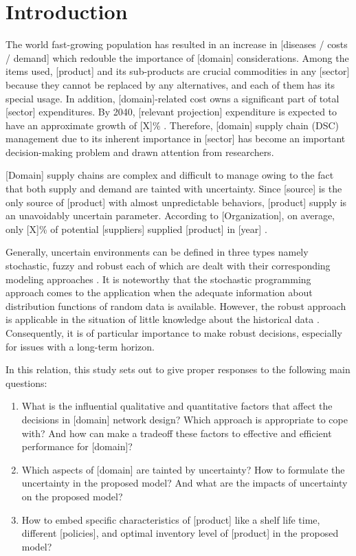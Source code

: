 \documentclass[10pt,twocolumn]{article}
\begin{document}
\thispagestyle{firstpage}

\section{Introduction}

The world fast-growing population has resulted in an increase in
[diseases / costs / demand] which redouble the importance of
[domain] considerations. Among the items used, [product] and its
sub-products are crucial commodities in any [sector] because they
cannot be replaced by any alternatives, and each of them has its
special usage. In addition, [domain]-related cost owns a significant
part of total [sector] expenditures. By 2040, [relevant projection]
expenditure is expected to have an approximate growth of [X]\%
\cite{Author2015}. Therefore, [domain] supply chain (DSC)
management due to its inherent importance in [sector] has become an
important decision-making problem and drawn attention from
researchers.

[Domain] supply chains are complex and difficult to manage owing to
the fact that both supply and demand are tainted with uncertainty.
Since [source] is the only source of [product] with almost
unpredictable behaviors, [product] supply is an unavoidably uncertain
parameter. According to [Organization], on average, only [X]\% of
potential [suppliers] supplied [product] in [year] \cite{WHO2016}.

Generally, uncertain environments can be defined in three types
namely stochastic, fuzzy and robust each of which are dealt with
their corresponding modeling approaches \cite{Tofighi2016}. It is
noteworthy that the stochastic programming approach comes to the
application when the adequate information about distribution
functions of random data is available. However, the robust approach
is applicable in the situation of little knowledge about the historical
data \cite{Torabi2015}. Consequently, it is of particular importance
to make robust decisions, especially for issues with a long-term
horizon.

In this relation, this study sets out to give proper responses to the
following main questions:

\begin{enumerate}
  \item What is the influential qualitative and quantitative factors
        that affect the decisions in [domain] network design? Which
        approach is appropriate to cope with? And how can make a
        tradeoff these factors to effective and efficient performance
        for [domain]?
  \item Which aspects of [domain] are tainted by uncertainty? How to
        formulate the uncertainty in the proposed model? And what are
        the impacts of uncertainty on the proposed model?
  \item How to embed specific characteristics of [product] like a
        shelf life time, different [policies], and optimal inventory
        level of [product] in the proposed model?
\end{enumerate}
\end{document}
